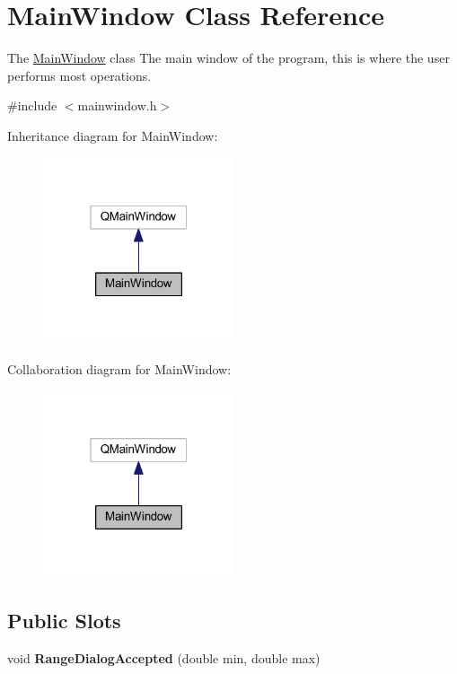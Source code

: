 \hypertarget{class_main_window}{\section{Main\+Window Class Reference}
\label{class_main_window}
}


The \hyperlink{class_main_window}{Main\+Window} class The main window of the program, this is where the user performs most operations.  




{\ttfamily \#include $<$mainwindow.\+h$>$}



Inheritance diagram for Main\+Window\+:\nopagebreak
\begin{figure}[H]
\begin{center}
\leavevmode
\includegraphics[width=160pt]{class_main_window__inherit__graph}
\end{center}
\end{figure}


Collaboration diagram for Main\+Window\+:\nopagebreak
\begin{figure}[H]
\begin{center}
\leavevmode
\includegraphics[width=160pt]{class_main_window__coll__graph}
\end{center}
\end{figure}
\subsection*{Public Slots}
\begin{DoxyCompactItemize}
\item 
\hypertarget{class_main_window_aabdd9af63bada1cef223752691c3d8e0}{void {\bfseries Range\+Dialog\+Accepted} (double min, double max)}\label{class_main_window_aabdd9af63bada1cef223752691c3d8e0}

\end{DoxyCompactItemize}

